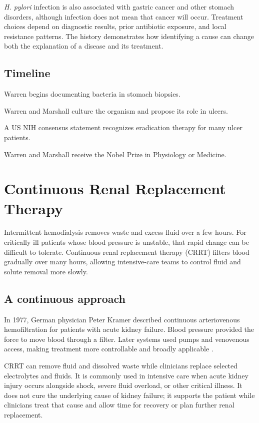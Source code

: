 \documentclass[12pt,oneside]{book}
\begin{document}
\emph{H. pylori} infection is also associated with gastric cancer and other
stomach disorders, although infection does not mean that cancer will occur.
Treatment choices depend on diagnostic results, prior antibiotic exposure,
and local resistance patterns. The history demonstrates how identifying a
cause can change both the explanation of a disease and its treatment.

\section*{Timeline}
\begin{description}[leftmargin=2.3cm,style=nextline]
  \item[1979] Warren begins documenting bacteria in stomach biopsies.
  \item[1982] Warren and Marshall culture the organism and propose its role in ulcers.
  \item[1994] A US NIH consensus statement recognizes eradication therapy for many ulcer patients.
  \item[2005] Warren and Marshall receive the Nobel Prize in Physiology or Medicine.
\end{description}
\chapter[Continuous Renal Replacement Therapy]{Continuous Renal Replacement Therapy}

Intermittent hemodialysis removes waste and excess fluid over a few hours.
For critically ill patients whose blood pressure is unstable, that rapid
change can be difficult to tolerate. Continuous renal replacement therapy
(CRRT) filters blood gradually over many hours, allowing intensive-care teams
to control fluid and solute removal more slowly.

\section{A continuous approach}
In 1977, German physician Peter Kramer described continuous arteriovenous
hemofiltration for patients with acute kidney failure. Blood pressure
provided the force to move blood through a filter. Later systems used pumps
and venovenous access, making treatment more controllable and broadly
applicable \cite{crrtHistory,crrtReview}.

CRRT can remove fluid and dissolved waste while clinicians replace selected
electrolytes and fluids. It is commonly used in intensive care when acute
kidney injury occurs alongside shock, severe fluid overload, or other
critical illness. It does not cure the underlying cause of kidney failure;
it supports the patient while clinicians treat that cause and allow time for
recovery or plan further renal replacement.
\end{document}
